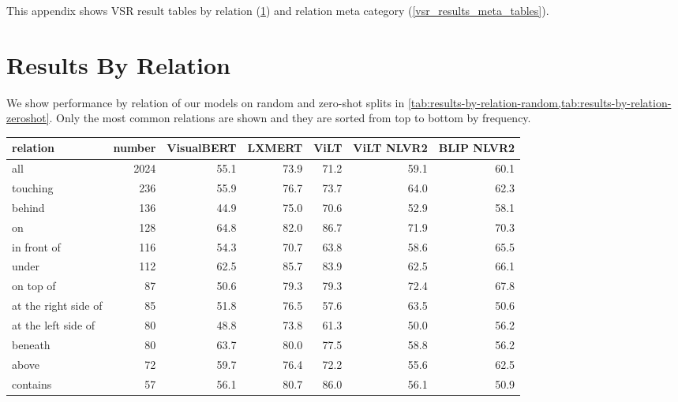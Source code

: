 This appendix shows VSR result tables by relation (\cref{vsr_results_relation_tables}) and relation meta category (\cref{vsr_results_meta_tables}).

\section{Results By Relation} \label{vsr_results_relation_tables}

We show performance by relation of our models on random and zero-shot splits in \cref{tab:results-by-relation-random,tab:results-by-relation-zeroshot}. Only the most common relations are shown and they are sorted from top to bottom by frequency.

\begin{table}[ht]
\centering
\begin{adjustbox}{max width=0.7\textwidth}
\begin{tabular}{lrrrrrr}
\toprule
relation &  number &  VisualBERT &  LXMERT &  ViLT &  ViLT NLVR2 &  BLIP NLVR2 \\
\midrule
all                  &    2024 &        55.1 &    73.9 &  71.2 &        59.1 &        60.1 \\
\midrule
touching             &     236 &        55.9 &    76.7 &  73.7 &        64.0 &        62.3 \\
behind               &     136 &        44.9 &    75.0 &  70.6 &        52.9 &        58.1 \\
on                   &     128 &        64.8 &    82.0 &  86.7 &        71.9 &        70.3 \\
in front of          &     116 &        54.3 &    70.7 &  63.8 &        58.6 &        65.5 \\
under                &     112 &        62.5 &    85.7 &  83.9 &        62.5 &        66.1 \\
on top of            &      87 &        50.6 &    79.3 &  79.3 &        72.4 &        67.8 \\
at the right side of &      85 &        51.8 &    76.5 &  57.6 &        63.5 &        50.6 \\
at the left side of  &      80 &        48.8 &    73.8 &  61.3 &        50.0 &        56.2 \\
beneath              &      80 &        63.7 &    80.0 &  77.5 &        58.8 &        56.2 \\
above                &      72 &        59.7 &    76.4 &  72.2 &        55.6 &        62.5 \\
contains             &      57 &        56.1 &    80.7 &  86.0 &        56.1 &        50.9 \\

\end{tabular}
\end{adjustbox}
\end{table}
